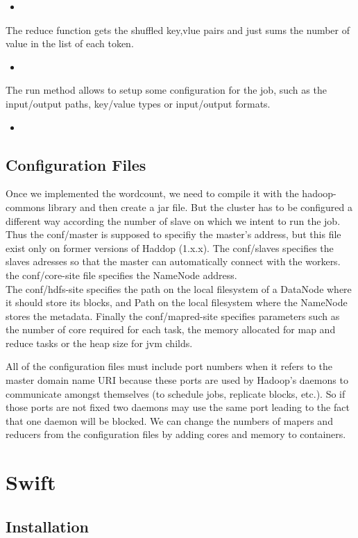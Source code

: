 \documentclass{article}
\newcommand{\Javas}[2]{
\begin{itemize}
\item[]
\end{itemize}
}
\begin{document}
\Javas{wordcount}{Map function}
The reduce function gets the shuffled key,vlue pairs and just sums the number of value in the list of each token.

\Javas{new2}{Reduce Function}

The run method allows to setup some configuration for the job, such as the input/output paths, key/value types or input/output formats.

\Javas{new3}{Run Function}

\subsection{Configuration Files}

Once we implemented the wordcount, we need to compile it with the hadoop-commons library and then create a jar file. But the cluster has to be configured a different way according the number of slave on which we intent to run the job. Thus the conf/master is supposed to specifiy the master's address, but this file exist only on former versions of Haddop (1.x.x). The conf/slaves specifies the slaves adresses so that the master can automatically connect with the workers. the conf/core-site file specifies the NameNode address.\\

The conf/hdfs-site specifies the path on the local filesystem of a DataNode where it should store its blocks, and Path on the local filesystem where the NameNode stores the metadata. Finally the conf/mapred-site specifies parameters such as the number of core required for each task, the memory allocated for map and reduce tasks or the heap size for jvm childs.

All of the configuration files must include port numbers when it refers to the master domain name URI because these ports are used by Hadoop’s daemons to communicate amongst themselves (to schedule jobs, replicate blocks, etc.). So if those ports are not fixed two daemons may use the same port leading to the fact that one daemon will be blocked. We can change the numbers of mapers and reducers from the configuration files by adding cores and memory to containers. 


\section{Swift}

\subsection{Installation}
\end{document}
